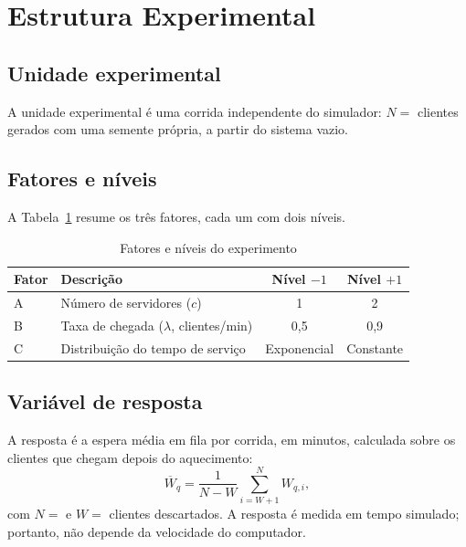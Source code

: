 \documentclass[stu,a4paper,12pt,floatsintext,biblatex]{apa7}
\begin{document}
\section{Estrutura Experimental}
\subsection{Unidade experimental}
A unidade experimental é uma corrida independente do simulador: $N = $ \NClientes{} clientes gerados com uma semente própria, a partir do sistema vazio.

\subsection{Fatores e níveis}
A Tabela~\ref{tab:fatores} resume os três fatores, cada um com dois níveis.

\begin{table}[H]
\caption{Fatores e níveis do experimento}
\label{tab:fatores}
\begin{tabular}{llcc}
\toprule
Fator & Descrição & Nível $-1$ & Nível $+1$ \\
\midrule
A & Número de servidores ($c$) & 1 & 2 \\
B & Taxa de chegada ($\lambda$, clientes/min) & 0,5 & 0,9 \\
C & Distribuição do tempo de serviço & Exponencial & Constante \\
\bottomrule
\end{tabular}
\end{table}

\subsection{Variável de resposta}
A resposta é a espera média em fila por corrida, em minutos, calculada sobre os clientes que chegam depois do aquecimento:
\begin{equation}
\overline{W}_q = \frac{1}{N - W} \sum_{i = W + 1}^{N} W_{q,i},
\end{equation}
com $N = $ \NClientes{} e $W = $ \Aquecimento{} clientes descartados.
A resposta é medida em tempo simulado; portanto, não depende da velocidade do computador.
\end{document}
